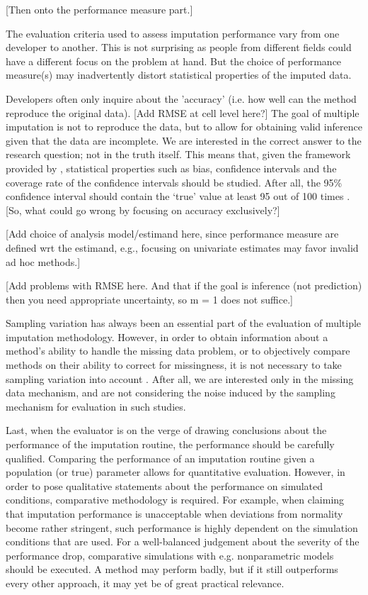 \documentclass[bimj,fleqn]{w-art}
\begin{document}
[Then onto the performance measure part.]

The evaluation criteria used to assess imputation performance vary from one developer to another. This is not surprising as people from different fields could have a different focus on the problem at hand. But the choice of performance measure(s) may inadvertently distort statistical properties of the imputed data.

Developers often only inquire about the 'accuracy' (i.e. how well can the method reproduce the original data). [Add RMSE at cell level here?] The goal of multiple imputation is not to reproduce the data, but to allow for obtaining valid inference given that the data are incomplete. We are interested in the correct answer to the research question; not in the truth itself. This means that, given the framework provided by \citet{rubi87}, statistical properties such as bias, confidence intervals and the coverage rate of the confidence intervals should be studied. After all, the 95\% confidence interval should contain the `true' value at least 95 out of 100 times \citep[][p. 591]{neym34}. [So, what could go wrong by focusing on accuracy exclusively?]

[Add choice of analysis model/estimand here, since performance measure are defined wrt the estimand, e.g., focusing on univariate estimates may favor invalid ad hoc methods.]

[Add problems with RMSE here. And that if the goal is inference (not prediction) then you need appropriate uncertainty, so m = 1 does not suffice.]

Sampling variation has always been an essential part of the evaluation of multiple imputation methodology. However, in order to obtain information about a method's ability to handle the missing data problem, or to objectively compare methods on their ability to correct for missingness, it is not necessary to take sampling variation into account \citep{vink14}. After all, we are interested only in the missing data mechanism, and are not considering the noise induced by the sampling mechanism for evaluation in such studies.

Last, when the evaluator is on the verge of drawing conclusions about the performance of the imputation routine, the performance should be carefully qualified. Comparing the performance of an imputation routine given a population (or true) parameter allows for quantitative evaluation. However, in order to pose qualitative statements about the performance on simulated conditions, comparative methodology is required. For example, when claiming that imputation performance is unacceptable when deviations from normality become rather stringent, such performance is highly dependent on the simulation conditions that are used. For a well-balanced judgement about the severity of the performance drop, comparative simulations with e.g. nonparametric models should be executed. A method may perform badly, but if it still outperforms every other approach, it may yet be of great practical relevance.
\end{document}
